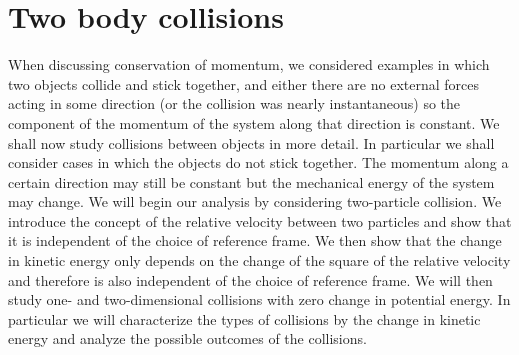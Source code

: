 \section{Two body collisions}
When discussing conservation of momentum, we considered examples in which two
objects collide and stick together, and either there are no external forces acting in some
direction (or the collision was nearly instantaneous) so the component of the momentum
of the system along that direction is constant. We shall now study collisions between
objects in more detail. In particular we shall consider cases in which the objects do not
stick together. The momentum along a certain direction may still be constant but the
mechanical energy of the system may change. We will begin our analysis by considering
two-particle collision. We introduce the concept of the relative velocity between two
particles and show that it is independent of the choice of reference frame. We then show
that the change in kinetic energy only depends on the change of the square of the relative
velocity and therefore is also independent of the choice of reference frame. We will then
study one- and two-dimensional collisions with zero change in potential energy. In
particular we will characterize the types of collisions by the change in kinetic energy and analyze the possible outcomes of the collisions.
